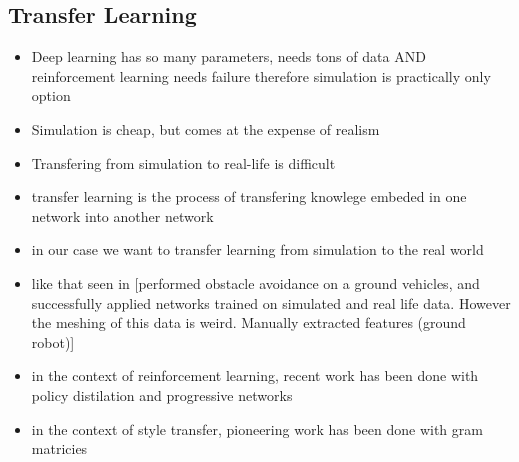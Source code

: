 \documentclass[paper=a4, fontsize=11pt]{scrartcl} %
\begin{document}
	\subsection{Transfer Learning}
	\begin{itemize}
		\item Deep learning has so many parameters, needs tons of data AND reinforcement learning needs failure therefore simulation is practically only option
		\item Simulation is cheap, but comes at the expense of realism
		\item Transfering from simulation to real-life is difficult
		\item transfer learning is the process of transfering knowlege embeded in one network into another network
		\item in our case we want to transfer learning from simulation to the real world
		\item like that seen in \cite{Michels2005} [performed obstacle avoidance on a ground vehicles, and successfully applied networks trained on simulated and real life data.  However the meshing of this data is weird.  Manually extracted features (ground robot)]
		\item in the context of reinforcement learning, recent work has been done with policy distilation \cite{Rusu2015} and progressive networks \cite{Rusu2016}
		\item in the context of style transfer, pioneering work \cite{Gatys2015} has been done with gram matricies
	\end{itemize}
\end{document}
